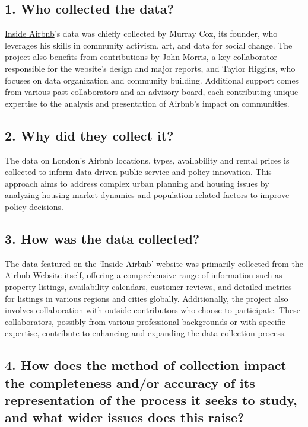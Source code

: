 \documentclass[
  a4paper,
  DIV=11,
  numbers=noendperiod]{scrartcl}
\begin{document}
\hypertarget{who-collected-the-data}{%
\subsection{1. Who collected the data?}\label{who-collected-the-data}}

\href{http://insideairbnb.com/about/}{Inside Airbnb}'s data was chiefly
collected by Murray Cox, its founder, who leverages his skills in
community activism, art, and data for social change. The project also
benefits from contributions by John Morris, a key collaborator
responsible for the website's design and major reports, and Taylor
Higgins, who focuses on data organization and community building.
Additional support comes from various past collaborators and an advisory
board, each contributing unique expertise to the analysis and
presentation of Airbnb's impact on communities.

\hypertarget{why-did-they-collect-it}{%
\subsection{2. Why did they collect it?}\label{why-did-they-collect-it}}

The data on London's Airbnb locations, types, availability and rental
prices is collected to inform data-driven public service and policy
innovation. This approach aims to address complex urban planning and
housing issues by analyzing housing market dynamics and
population-related factors to improve policy decisions.

\hypertarget{how-was-the-data-collected}{%
\subsection{3. How was the data
collected?}\label{how-was-the-data-collected}}

The data featured on the `Inside Airbnb' website was primarily collected
from the Airbnb Website itself, offering a comprehensive range of
information such as property listings, availability calendars, customer
reviews, and detailed metrics for listings in various regions and cities
globally. Additionally, the project also involves collaboration with
outside contributors who choose to participate. These collaborators,
possibly from various professional backgrounds or with specific
expertise, contribute to enhancing and expanding the data collection
process.

\hypertarget{how-does-the-method-of-collection-impact-the-completeness-andor-accuracy-of-its-representation-of-the-process-it-seeks-to-study-and-what-wider-issues-does-this-raise}{%
\subsection{4. How does the method of collection impact the completeness
and/or accuracy of its representation of the process it seeks to study,
and what wider issues does this
raise?}\label{how-does-the-method-of-collection-impact-the-completeness-andor-accuracy-of-its-representation-of-the-process-it-seeks-to-study-and-what-wider-issues-does-this-raise}}
\end{document}
